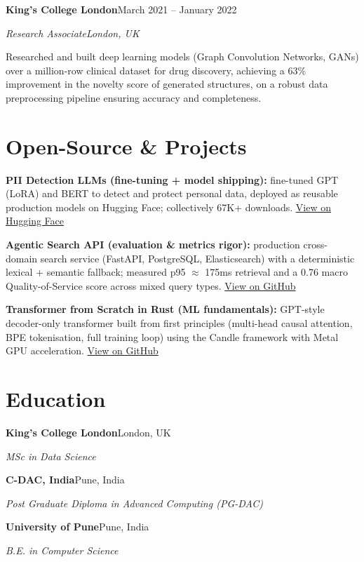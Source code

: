 \documentclass[10pt,a4paper]{article}
\newcommand{\entry}[4]{%
  {\color{company}\bfseries #1}\hfill {\color{muted}#2}\par
  \vspace{1pt}
  {\itshape #3}\hfill {\color{muted}\itshape #4}\par
  \vspace{3pt}%
}
\begin{document}
\entry{King's College London}{March 2021 -- January 2022}{Research Associate}{London, UK}
\begin{tight}
  \item Researched and built deep learning models (Graph Convolution Networks, GANs) over a million-row clinical dataset for drug discovery, achieving a 63\% improvement in the novelty score of generated structures, on a robust data preprocessing pipeline ensuring accuracy and completeness.
\end{tight}

\section{Open-Source \& Projects}
\begin{tight}
  \item \textbf{PII Detection LLMs (fine-tuning + model shipping):} fine-tuned GPT (LoRA) and BERT to detect and protect personal data, deployed as reusable production models on Hugging Face; collectively 67K+ downloads. \href{https://huggingface.co/ab-ai/pii_model}{View on Hugging Face}
  \item \textbf{Agentic Search API (evaluation \& metrics rigor):} production cross-domain search service (FastAPI, PostgreSQL, Elasticsearch) with a deterministic lexical + semantic fallback; measured p95 $\approx$ 175ms retrieval and a 0.76 macro Quality-of-Service score across mixed query types. \href{https://github.com/abhijeetscode/search-agent}{View on GitHub}
  \item \textbf{Transformer from Scratch in Rust (ML fundamentals):} GPT-style decoder-only transformer built from first principles (multi-head causal attention, BPE tokenisation, full training loop) using the Candle framework with Metal GPU acceleration. \href{https://github.com/abhijeetscode/transformer-rust}{View on GitHub}
\end{tight}

\section{Education}
{\color{company}\bfseries King's College London}\hfill {\color{muted}London, UK}\par
{\itshape MSc in Data Science}\par\vspace{2pt}
{\color{company}\bfseries C-DAC, India}\hfill {\color{muted}Pune, India}\par
{\itshape Post Graduate Diploma in Advanced Computing (PG-DAC)}\par\vspace{2pt}
{\color{company}\bfseries University of Pune}\hfill {\color{muted}Pune, India}\par
{\itshape B.E. in Computer Science}\par
\end{document}
